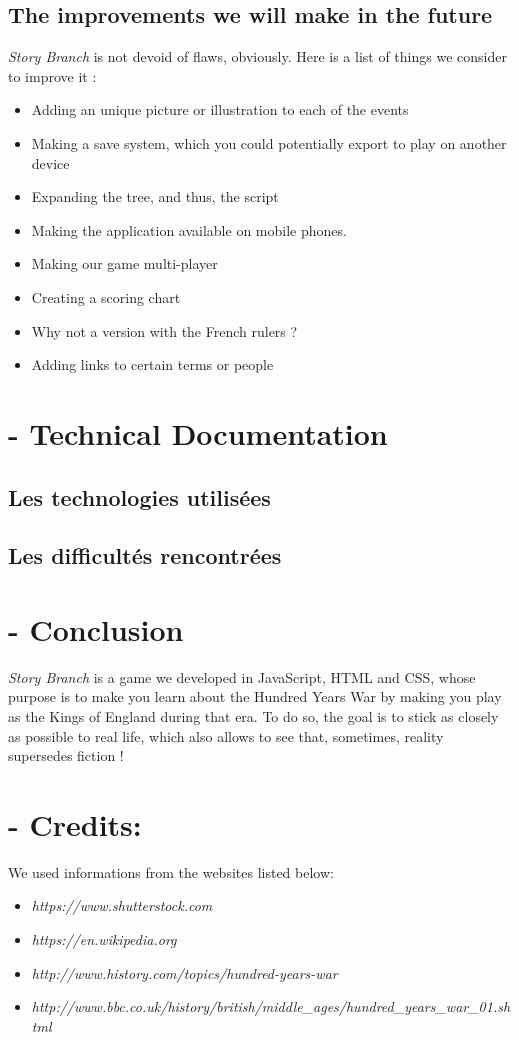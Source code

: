 \documentclass{scrreprt}
\begin{document}
\section*{The improvements we will make in the future}

\textit{Story Branch} is not devoid of flaws, obviously. Here is a list of things we consider to improve it :
\begin{itemize}
\item Adding an unique picture or illustration to each of the events
\item Making a save system, which you could potentially export to play on another device
\item Expanding the tree, and thus, the script
\item Making the application available on mobile phones.
\item Making our game multi-player
\item Creating a scoring chart
\item Why not a version with the French rulers ?
\item Adding links to certain terms or people
\end{itemize}

{\let\clearpage\relax \chapter{- Technical Documentation}}

\section{Les technologies utilisées}

\section*{Les difficultés rencontrées}

{\let\clearpage\relax \chapter{- Conclusion}}
\textit{Story Branch} is a game we developed in JavaScript, HTML and CSS, whose purpose is to make you learn about the Hundred Years War by making you play as the Kings of England during that era. To do so, the goal is to stick as closely as possible to real life, which also allows to see that, sometimes, reality supersedes fiction !


{\let\clearpage\relax \chapter{- Credits:}}

We used informations from the websites listed below:
\begin{itemize}
\item \textit{https://www.shutterstock.com}
\item \textit{https://en.wikipedia.org}
\item \textit{http://www.history.com/topics/hundred-years-war}
\item \textit{http://www.bbc.co.uk/history/british/middle_ages/hundred_years_war_01.shtml}
\end{itemize}
\end{document}
